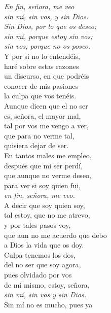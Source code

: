 \begin{exe}
	\ex\label{ex:glosa}\begin{multicols}{2}\textit{En fin, señora, me veo}\\
	\textit{sin mí, sin vos, y sin Dios.}\\
	\textit{Sin Dios, por lo que os deseo;}\\
	\textit{sin mí, porque estoy sin vos;}\\
	\textit{sin vos, porque no os poseo.}\vspace{.222\baselineskip}\\
	Y por si no lo entendéis,\\
	haré sobre estas razones\\
	un discurso, en que podréis\\
	conocer de mis pasiones\\
	la culpa que vos tenéis.\vspace{.222\baselineskip}\\
	Aunque dicen que el no ser\\
	es, señora, el mayor mal,\\
	tal por vos me vengo a ver,\\
	que para no verme tal,\\
	quisiera dejar de ser.\\
	En tantos males me empleo,\\
	después que mi ser perdí,\\
	que aunque no verme deseo,\\
	para ver si soy quien fui,\\
	\textit{en fin, señora, me veo.}\vspace{.222\baselineskip}\\
	A decir que soy quien soy,\\
	tal estoy, que no me atrevo,\\
	y por tales pasos voy,\\
	que aun no me acuerdo que debo\\
	a Dios la vida que os doy.\\
	Culpa tenemos los dos,\\
	del no ser que soy agora,\\
	pues olvidado por vos\\
	de mí mismo, estoy, señora,\\
	\textit{sin mí, sin vos y sin Dios.}\vspace{.222\baselineskip}\\
	Sin mí no es mucho, pues ya\\

\end{multicols}
\end{exe}
